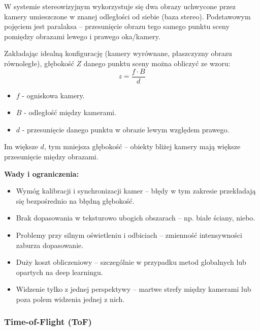\documentclass[magisterska]{pracadypl}
\begin{document}
W systemie stereowizyjnym wykorzystuje się dwa obrazy uchwycone przez kamery umieszczone w znanej odległości od siebie (baza stereo). Podstawowym pojęciem jest paralaksa – przesunięcie obrazu tego samego punktu sceny pomiędzy obrazami lewego i prawego oka/kamery.

Zakładając idealną konfigurację (kamery wyrównane, płaszczyzny obrazu równoległe), głębokość $Z$ danego punktu sceny można obliczyć ze wzoru:
\[
z = \frac{f \cdot B}{d}
\]
\begin{itemize}
  \item $f$ - ogniskowa kamery.
  \item $B$ - odległość między kamerami.
  \item $d$ - przesunięcie danego punktu w obrazie lewym względem prawego.
\end{itemize}

Im większe $d$, tym mniejsza głębokość – obiekty bliżej kamery mają większe przesunięcie między obrazami.

\begin{minipage}[t]{\textwidth}
\textbf{Wady i ograniczenia:}
\begin{itemize}
  \item Wymóg kalibracji i synchronizacji kamer – błędy w tym zakresie przekładają się bezpośrednio na błędną głębokość.

  \item Brak dopasowania w teksturowo ubogich obszarach – np. białe ściany, niebo.

  \item Problemy przy silnym oświetleniu i odbiciach – zmienność intensywności zaburza dopasowanie.

  \item Duży koszt obliczeniowy – szczególnie w przypadku metod globalnych lub opartych na deep learningu.

  \item Widzenie tylko z jednej perspektywy – martwe strefy między kamerami lub poza polem widzenia jednej z nich.
\end{itemize}
\end{minipage}

\subsubsection{Time-of-Flight (ToF)}
\end{document}
